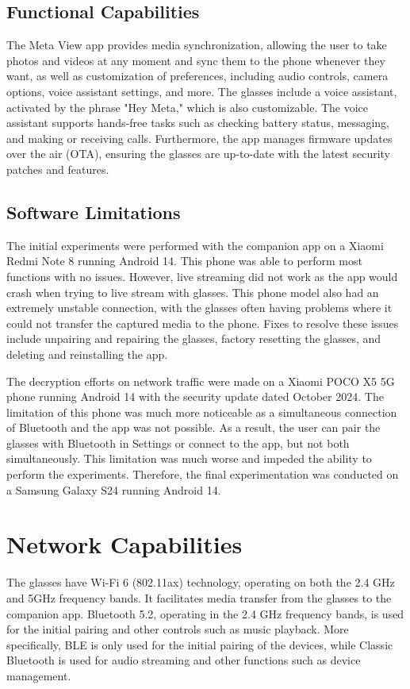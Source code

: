 \subsection*{Functional Capabilities}
The Meta View app provides media synchronization, allowing the user to take photos and videos at any moment and sync them to the phone whenever they want, as well as customization of preferences, including audio controls, camera options, voice assistant settings, and more. The glasses include a voice assistant, activated by the phrase "Hey Meta," which is also customizable. The voice assistant supports hands-free tasks such as checking battery status, messaging, and making or receiving calls. Furthermore, the app manages firmware updates over the air (OTA), ensuring the glasses are up-to-date with the latest security patches and features. 

\subsection*{Software Limitations}
The initial experiments were performed with the companion app on a Xiaomi Redmi Note 8 running Android 14. This phone was able to perform most functions with no issues. However, live streaming did not work as the app would crash when trying to live stream with glasses. This phone model also had an extremely unstable connection, with the glasses often having problems where it could not transfer the captured media to the phone. Fixes to resolve these issues include unpairing and repairing the glasses, factory resetting the glasses, and deleting and reinstalling the app. 

The decryption efforts on network traffic were made on a Xiaomi POCO X5 5G phone running Android 14 with the security update dated October 2024. The limitation of this phone was much more noticeable as a simultaneous connection of Bluetooth and the app was not possible. As a result, the user can pair the glasses with Bluetooth in Settings or connect to the app, but not both simultaneously. This limitation was much worse and impeded the ability to perform the experiments. Therefore, the final experimentation was conducted on a Samsung Galaxy S24 running Android 14.


\section{Network Capabilities}
The glasses have Wi-Fi 6 (802.11ax) technology, operating on both the 2.4 GHz and 5GHz frequency bands. It facilitates media transfer from the glasses to the companion app. Bluetooth 5.2, operating in the 2.4 GHz frequency bands, is used for the initial pairing and other controls such as music playback. More specifically, BLE is only used for the initial pairing of the devices, while Classic Bluetooth is used for audio streaming and other functions such as device management.


